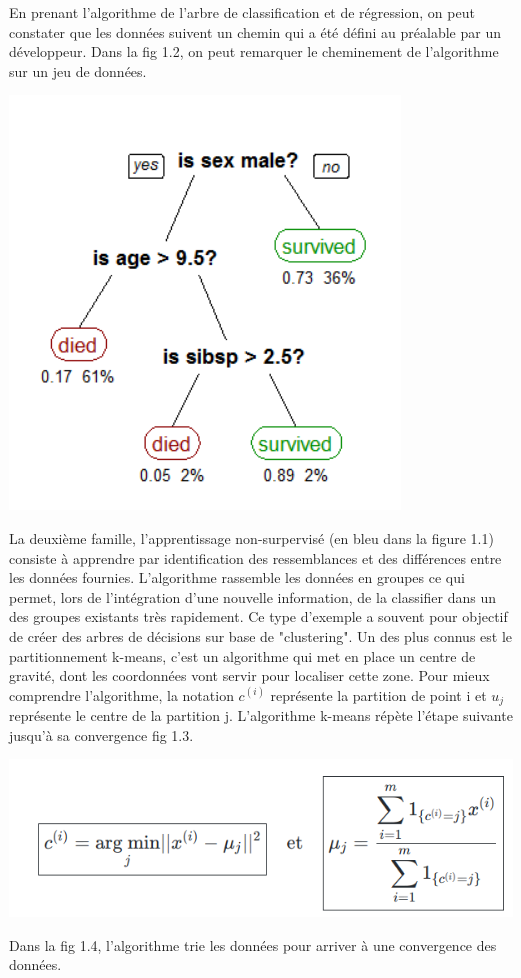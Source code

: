 \documentclass[12pt,a4paper,french]{report}
\begin{document}
En prenant l'algorithme de l'arbre de classification et de régression, on peut constater que les données suivent un chemin qui a été défini au préalable par un développeur. Dans la fig 1.2, on peut remarquer le cheminement de l'algorithme sur un jeu de données.

\begin{center}
	\includegraphics[scale=0.5]{ML_superviser}
	\label{fig1}
\end{center}


La deuxième famille, l'apprentissage non-surpervisé (en bleu dans la figure 1.1) consiste à apprendre par identification des ressemblances et des différences entre les données fournies. L'algorithme rassemble les données en groupes ce qui permet, lors de l'intégration d'une nouvelle information, de la classifier dans un des groupes existants très rapidement. Ce type d'exemple a souvent pour objectif de créer des arbres de décisions sur base de "clustering".
Un des plus connus est le partitionnement k-means, c'est un algorithme qui met en place un centre de gravité, dont les coordonnées vont servir pour localiser cette zone. Pour mieux comprendre l'algorithme, la notation $c^{(i)}$ représente la partition de point i et $u_j$ représente le centre de la partition j. L'algorithme k-means répète l'étape suivante jusqu'à sa convergence fig 1.3.\\

\begin{center}
	\includegraphics[scale=0.5]{algo_k_means}
	\label{fig1}
\end{center}
\pagebreak
Dans la fig 1.4, l'algorithme trie les données pour arriver à une convergence des données.
\end{document}
